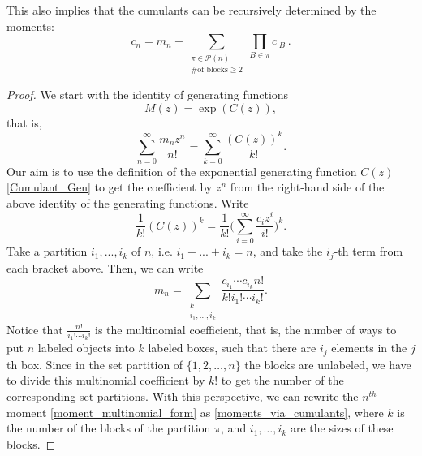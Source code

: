 \documentclass[letterpaper,11pt,oneside,reqno]{amsart}
\numberwithin{equation}{section}
\theoremstyle{definition}
\begin{document}
This also implies that the cumulants can be recursively determined by the moments:
\begin{equation}\label{cumulants_via_moments}
	c_n=m_n-\sum_{\substack{\pi\in\mathcal{P}(n)\\\text{\# of blocks}\geq 2}} \prod_{B\in \pi} c_{|B|}.
\end{equation}
\begin{proof}
	We start with the identity of generating functions 
	\begin{equation}\label{M_exp_C}
		M(z)=\exp(C(z)),
	\end{equation}
	that is,
	\begin{equation*}
		\sum_{n=0}^{\infty}\frac{m_nz^{n}}{n!}=
		\sum_{k=0}^{\infty}\frac{(C(z))^{k}}{k!}.
	\end{equation*}
	Our aim is to use the definition of the exponential
	generating function $C(z)$ \eqref{Cumulant_Gen}
	to get the coefficient by $z^{n}$ from the right-hand side of the above identity
	of the generating functions. Write
	\begin{equation*}
		\frac{1}{k!}(C(z))^k=\frac1{k!}{\Big(\sum_{i=0}^\infty \frac{c_i z^i}{i!}\Big)^k}.
	\end{equation*}
	Take a partition $i_1,...,i_k$ of $n$, i.e. 
	$i_1+...+i_k=n$, 
	and take the $i_j$-th term from each bracket above.
	Then, we can write
	\begin{equation}
		\label{moment_multinomial_form}
		m_n=\sum_{\substack{k\\i_1,...,i_k}}\frac{c_{i_1}\cdots c_{i_k}n!}{k!i_1!\cdots i_k!}.
	\end{equation}
	Notice that $\displaystyle \frac{n!}{i_1!\cdots i_k!}$ is the multinomial coefficient,
	that is, the number of ways to put $n$ labeled objects into $k$
	labeled boxes, such that there are $i_j$ elements in the $j$th box. 
	Since in the set partition of $\{1,2,\ldots,n\}$
	the blocks are unlabeled, we have to divide this multinomial
	coefficient by $k!$ to get the number of the corresponding set partitions.
	With this perspective, we can rewrite the $n^{th}$ moment \eqref{moment_multinomial_form}
	as \eqref{moments_via_cumulants}, where $k$ is the number of the blocks of the partition
	$\pi$, and $i_1,\ldots,i_k$ are the sizes of these blocks.
\end{proof}
\end{document}
